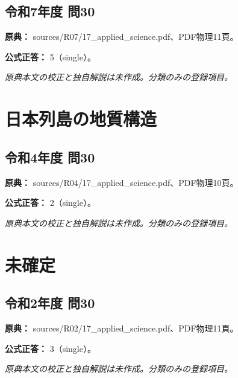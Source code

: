 \subsection{令和7年度 問30}
\label{q:r07-reg-applied-30}

\noindent\textbf{原典：} sources/R07/17\_applied\_science.pdf、PDF物理11頁。

\textbf{公式正答：} 5（single）。

\par\textit{原典本文の校正と独自解説は未作成。分類のみの登録項目。}

\section{日本列島の地質構造}

\subsection{令和4年度 問30}
\label{q:r04-reg-applied-30}

\noindent\textbf{原典：} sources/R04/17\_applied\_science.pdf、PDF物理10頁。

\textbf{公式正答：} 2（single）。

\par\textit{原典本文の校正と独自解説は未作成。分類のみの登録項目。}

\section{未確定}

\subsection{令和2年度 問30}
\label{q:r02-reg-applied-30}

\noindent\textbf{原典：} sources/R02/17\_applied\_science.pdf、PDF物理11頁。

\textbf{公式正答：} 3（single）。

\par\textit{原典本文の校正と独自解説は未作成。分類のみの登録項目。}

